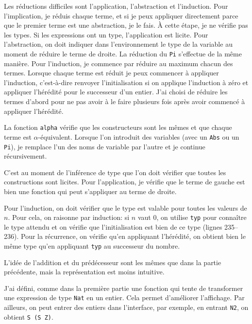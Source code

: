 \documentclass[a4paper]{article}
\begin{document}
    Les réductions difficiles sont l'application, l'abstraction et l'induction. Pour l'implication, je réduis chaque terme, et si je peux appliquer directement parce que le premier terme est une abstraction, je le fais. À cette étape, je ne vérifie pas les types. Si les expressions ont un type, l'application est licite. Pour l'abstraction, on doit indiquer dans l'environnement le type de la variable au moment de réduire le terme de droite. La réduction du \verb|Pi| s'effectue de la même manière. Pour l'induction, je commence par réduire au maximum chacun des termes. Lorsque chaque terme est réduit je peux commencer à appliquer l'induction, c'est-à-dire renvoyer l'initialisation si on applique l'induction à zéro et appliquer l'hérédité pour le successeur d'un entier. J'ai choisi de réduire les termes d'abord pour ne pas avoir à le faire plusieurs fois après avoir commencé à appliquer l'hérédité. 


    La fonction \verb|alpha| vérifie que les constructeurs sont les mêmes et que chaque terme est $\alpha$-équivalent. Lorsque l'on introduit des variables (avec un \verb|Abs| ou un \verb|Pi|), je remplace l'un des noms de variable par l'autre et je continue récursivement.
    
    C'est au moment de l'inférence de type que l'on doit vérifier que toutes les constructions sont licites. Pour l'application, je vérifie que le terme de gauche est bien une fonction qui peut s'appliquer au terme de droite. 

    Pour l'induction, on doit vérifier que le type est valable pour toutes les valeurs de $n$. Pour cela, on raisonne par induction: si $n$ vaut $0$, on utilise \verb|typ| pour connaître le type attendu et on vérifie que l'initialisation est bien de ce type (lignes 235--236). Pour la récurrence, on vérifie qu'en appliquant l'hérédité, on obtient bien le même type qu'en appliquant \verb|typ| au successeur du nombre.  

    L'idée de l'addition et du prédécesseur sont les mêmes que dans la partie précédente, mais la représentation est moins intuitive.

    J'ai défini, comme dans la première partie une fonction qui tente de transformer une expression de type \verb|Nat| en un entier. Cela permet d'améliorer l'affichage. Par ailleurs, on peut entrer des entiers dans l'interface, par exemple, en entrant \verb|N2|, on obtient \verb|S (S Z)|.
\end{document}
